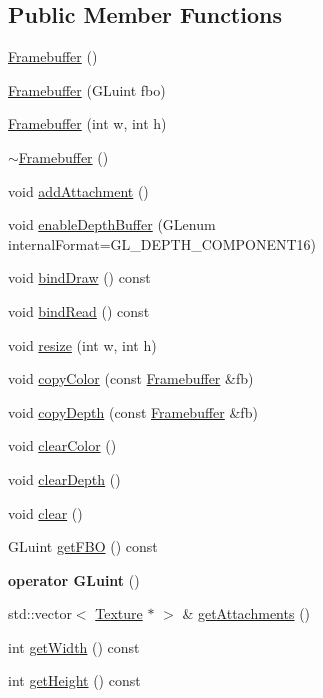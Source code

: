 \subsection*{Public Member Functions}
\begin{DoxyCompactItemize}
\item 
\hyperlink{class_framebuffer_a4f10f2020d414add1ea0e6553908c86b}{Framebuffer} ()
\item 
\hyperlink{class_framebuffer_a46ec55ab64b360550afb2de19043852a}{Framebuffer} (G\+Luint fbo)
\item 
\hyperlink{class_framebuffer_aaed0ae64dc7a0b2762ce74d89913365a}{Framebuffer} (int w, int h)
\item 
\hyperlink{class_framebuffer_a037bf3e17455354d5d907ceea00313dd}{$\sim$\+Framebuffer} ()
\item 
void \hyperlink{class_framebuffer_a167694f148f4de766971234389f04b8a}{add\+Attachment} ()
\item 
void \hyperlink{class_framebuffer_a1cc8b67cd13927bfb88b52fe5886d580}{enable\+Depth\+Buffer} (G\+Lenum internal\+Format=G\+L\+\_\+\+D\+E\+P\+T\+H\+\_\+\+C\+O\+M\+P\+O\+N\+E\+N\+T16)
\item 
void \hyperlink{class_framebuffer_a4106324f9cffad333255ce5dab0d4c73}{bind\+Draw} () const 
\item 
void \hyperlink{class_framebuffer_a9f14f58040d7d242f28dad5aff1a5564}{bind\+Read} () const 
\item 
void \hyperlink{class_framebuffer_a9479ea40d39418a623f64d91b151163f}{resize} (int w, int h)
\item 
void \hyperlink{class_framebuffer_a2182f6f6c725b0efa128a6b5775241e8}{copy\+Color} (const \hyperlink{class_framebuffer}{Framebuffer} \&fb)
\item 
void \hyperlink{class_framebuffer_a3fdff897f598d2c659e251de3c8325da}{copy\+Depth} (const \hyperlink{class_framebuffer}{Framebuffer} \&fb)
\item 
void \hyperlink{class_framebuffer_a54aeea0a6f75c104fd974b0743cac55c}{clear\+Color} ()
\item 
void \hyperlink{class_framebuffer_a01944581e97067094ae7902c43da45ee}{clear\+Depth} ()
\item 
void \hyperlink{class_framebuffer_a29f3edfceab261b122f09a8a1b067b41}{clear} ()
\item 
G\+Luint \hyperlink{class_framebuffer_af19335525cae0fb92f20aa46f18d426c}{get\+F\+B\+O} () const 
\item 
\hypertarget{class_framebuffer_ab7fee6a15f7fc7fa9b8585d4c4c08f03}{}{\bfseries operator G\+Luint} ()\label{class_framebuffer_ab7fee6a15f7fc7fa9b8585d4c4c08f03}

\item 
std\+::vector$<$ \hyperlink{class_texture}{Texture} $\ast$ $>$ \& \hyperlink{class_framebuffer_aab2ffec3fc4c6d5efe71e2a8bea64f8b}{get\+Attachments} ()
\item 
int \hyperlink{class_framebuffer_a7b32671cc35241f0e8a75fe0565003d8}{get\+Width} () const 
\item 
int \hyperlink{class_framebuffer_ab1e7b6a5fb21ab0462536f823c97f7d1}{get\+Height} () const 
\end{DoxyCompactItemize}
